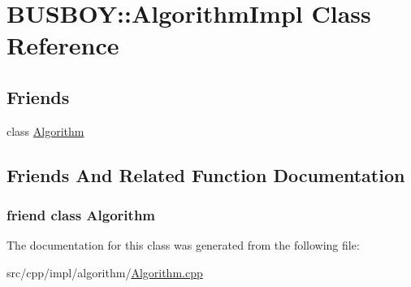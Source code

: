 \hypertarget{classBUSBOY_1_1AlgorithmImpl}{
\section{BUSBOY::AlgorithmImpl Class Reference}
\label{classBUSBOY_1_1AlgorithmImpl}
}
\subsection*{Friends}
\begin{DoxyCompactItemize}
\item 
class \hyperlink{classBUSBOY_1_1AlgorithmImpl_ab016b9124e80f55ad92e01579c060f08}{Algorithm}
\end{DoxyCompactItemize}


\subsection{Friends And Related Function Documentation}
\hypertarget{classBUSBOY_1_1AlgorithmImpl_ab016b9124e80f55ad92e01579c060f08}{
\subsubsection[{Algorithm}]{\setlength{\rightskip}{0pt plus 5cm}friend class {\bf Algorithm}}}
\label{classBUSBOY_1_1AlgorithmImpl_ab016b9124e80f55ad92e01579c060f08}


The documentation for this class was generated from the following file:\begin{DoxyCompactItemize}
\item 
src/cpp/impl/algorithm/\hyperlink{Algorithm_8cpp}{Algorithm.cpp}\end{DoxyCompactItemize}
